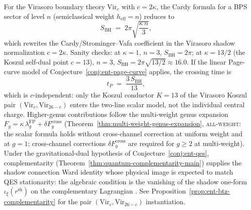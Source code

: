\begin{remark}
\label{rem:bps-entropy-shadow}
For the Virasoro boundary theory $\mathrm{Vir}_c$ with
$c = 2\kappa$, the Cardy formula for a BPS sector of level
$n$ \textup{(}semiclassical weight $h_{\mathrm{eff}} = n$\textup{)}
reduces to
\begin{equation}\label{eq:bps-entropy-shadow}
S_{\mathrm{BH}}
\;=\;
2\pi\sqrt{\frac{\kappa\,n}{3}},
\end{equation}
which rewrites the Cardy/Strominger--Vafa coefficient
\cite{Strominger-Vafa96} in the Virasoro shadow normalization
$c=2\kappa$.  Sanity checks: at $\kappa = 1$, $n = 3$,
$S_{\mathrm{BH}} = 2\pi$; at $\kappa = 13/2$
\textup{(}the Koszul self-dual point $c = 13$\textup{)},
$n = 3$, $S_{\mathrm{BH}} = 2\pi\sqrt{13/2} \approx 16.0$.
If the linear Page-curve model of
Conjecture~\ref{conj:ent-page-curve} applies, the crossing time is
\begin{equation}\label{eq:bps-page-time}
t_P \;=\; \frac{3\,S_{\mathrm{BH}}}{13},
\end{equation}
which is $c$-independent: only the Koszul conductor
$K = 13$ of the Virasoro Koszul pair
$(\mathrm{Vir}_c, \mathrm{Vir}_{26-c})$ enters the two-line scalar
model, not the individual central charge. Higher-genus contributions
follow the multi-weight genus expansion
$F_g = \kappa\,\lambda_g^{\mathrm{FP}} + \delta F_g^{\mathrm{cross}}$
\textup{(}Theorem~\ref{thm:multi-weight-genus-expansion},
\textsc{all-weight}: the scalar formula holds without
cross-channel correction at uniform weight and at $g = 1$;
cross-channel corrections
$\delta F_g^{\mathrm{cross}}$ are required for $g \ge 2$
at multi-weight\textup{)}. Under the gravitational-dual hypothesis
of Conjecture~\ref{conj:ent-qes}, complementarity
\textup{(}Theorem~\ref{thm:quantum-complementarity-main}\textup{)}
supplies the shadow connection Ward identity whose physical image is
expected to match QES stationarity: the algebraic condition is the
vanishing of the shadow one-form $\iota_\xi(r^{\mathrm{sh}})$ on the
complementary Lagrangian
\cite{Hartle-Hawking83}. See
Proposition~\ref{prop:ent-btz-complementarity} for the
pair $(\mathrm{Vir}_c,\mathrm{Vir}_{26-c})$ instantiation.
\end{remark}

